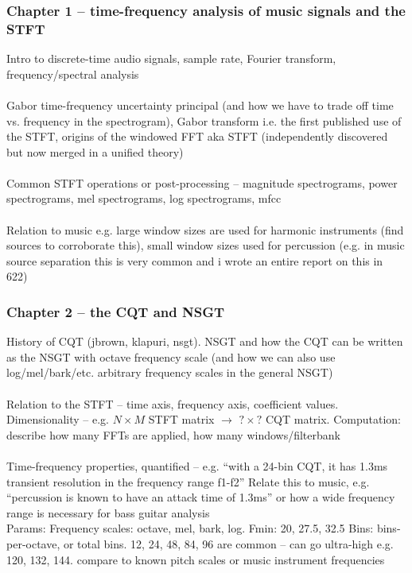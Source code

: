 \documentclass[usenames,dvipsnames]{beamer}
\begin{document}
\begin{frame}
	\frametitle{Chapter 1 -- time-frequency analysis of music signals and the STFT}
	Intro to discrete-time audio signals, sample rate, Fourier transform, frequency/spectral analysis\\\ \\
	Gabor time-frequency uncertainty principal (and how we have to trade off time vs. frequency in the spectrogram), Gabor transform i.e. the first published use of the STFT, origins of the windowed FFT aka STFT (independently discovered but now merged in a unified theory)\\\ \\
	Common STFT operations or post-processing -- magnitude spectrograms, power spectrograms, mel spectrograms, log spectrograms, mfcc\\\ \\
	Relation to music e.g. large window sizes are used for harmonic instruments (find sources to corroborate this), small window sizes used for percussion (e.g. in music source separation this is very common and i wrote an entire report on this in 622)
\end{frame}

\begin{frame}
	\frametitle{Chapter 2 -- the CQT and NSGT}
	History of CQT (jbrown, klapuri, nsgt). NSGT and how the CQT can be written as the NSGT with octave frequency scale (and how we can also use log/mel/bark/etc. arbitrary frequency scales in the general NSGT)\\\ \\
	Relation to the STFT -- time axis, frequency axis, coefficient values. Dimensionality -- e.g. $N \times M$  STFT matrix $\rightarrow$ $? \times ?$ CQT matrix. Computation: describe how many FFTs are applied, how many windows/filterbank\\\ \\
	Time-frequency properties, quantified -- e.g. ``with a 24-bin CQT, it has 1.3ms transient resolution in the frequency range f1-f2'' Relate this to music, e.g. ``percussion is known to have an attack time of 1.3ms'' or how a wide frequency range is necessary for bass guitar analysis\\
Params: Frequency scales: octave, mel, bark, log. Fmin: 20, 27.5, 32.5 Bins: bins-per-octave, or total bins. 12, 24, 48, 84, 96 are common -- can go ultra-high e.g. 120, 132, 144. compare to known pitch scales or music instrument frequencies
\end{frame}
\end{document}
